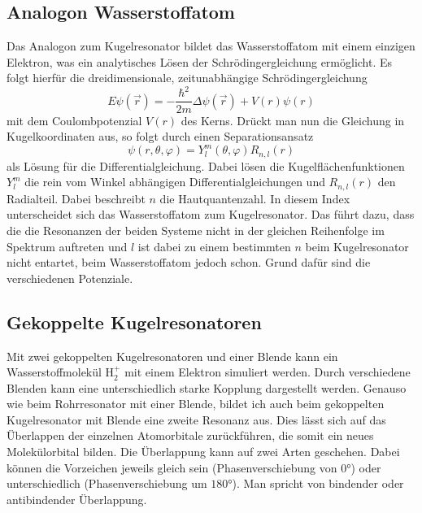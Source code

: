 \subsection{Analogon Wasserstoffatom}
Das Analogon zum Kugelresonator bildet das Wasserstoffatom mit einem einzigen Elektron, was ein analytisches
Lösen der Schrödingergleichung ermöglicht.
Es folgt hierfür die dreidimensionale, zeitunabhängige Schrödingergleichung
\begin{equation}
    E\psi(\vec{r})=-\frac{\hbar^2}{2m}\Delta\psi(\vec{r})+V(r)\psi(r)
\end{equation}
mit dem Coulombpotenzial $V(r)$ des Kerns. Drückt man nun die Gleichung in Kugelkoordinaten aus, 
so folgt durch einen Separationsansatz 
\begin{equation}
    \psi(r{,}\theta{,}\varphi)=Y_l^m(\theta{,}\varphi)R_{n{,}l}(r)
\end{equation}
als Lösung für die Differentialgleichung. Dabei lösen die Kugelflächenfunktionen $Y_l^m$
die rein vom Winkel abhängigen Differentialgleichungen und $R_{n{,}l}(r)$ den Radialteil. Dabei beschreibt
$n$ die Hautquantenzahl. In diesem Index unterscheidet sich das Wasserstoffatom zum Kugelresonator. Das führt dazu, dass die
die Resonanzen der beiden Systeme nicht in der gleichen Reihenfolge im Spektrum auftreten und $l$ ist dabei zu einem bestimmten
$n$ beim Kugelresonator nicht entartet, beim Wasserstoffatom jedoch schon. Grund dafür sind die verschiedenen Potenziale.

\subsection{Gekoppelte Kugelresonatoren}
Mit zwei gekoppelten Kugelresonatoren und einer Blende kann ein Wasserstoffmolekül $\text{H}_2^+$ mit einem Elektron simuliert werden.
Durch verschiedene Blenden kann eine unterschiedlich starke Kopplung dargestellt werden.
Genauso wie beim Rohrresonator mit einer Blende, bildet ich auch beim gekoppelten Kugelresonator mit Blende eine zweite Resonanz aus.
Dies lässt sich auf das Überlappen der einzelnen Atomorbitale zurückführen, die somit ein neues Molekülorbital bilden. Die Überlappung kann auf zwei Arten geschehen.
Dabei können die Vorzeichen jeweils gleich sein (Phasenverschiebung von $0°$) oder unterschiedlich (Phasenverschiebung um $180°$). Man spricht von
bindender oder antibindender Überlappung.\\

